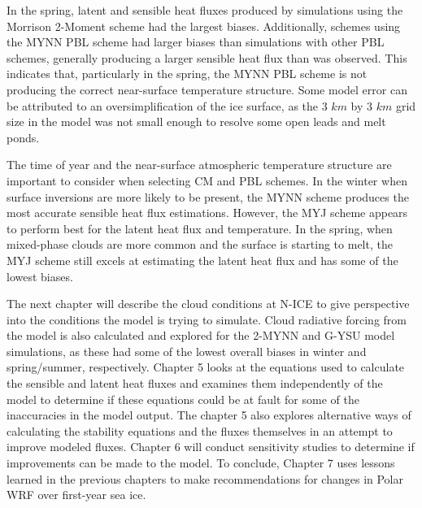 In the spring, latent and sensible heat fluxes produced by simulations using the Morrison 2-Moment scheme had the largest biases. Additionally, schemes using the MYNN PBL scheme had larger biases than simulations with other PBL schemes, generally producing a larger sensible heat flux than was observed. This indicates that, particularly in the spring, the MYNN PBL scheme is not producing the correct near-surface temperature structure. Some model error can be attributed to an oversimplification of the ice surface, as the 3 $km$ by 3 $km$ grid size in the model was not small enough to resolve some open leads and melt ponds. 

The time of year and the near-surface atmospheric temperature structure are important to consider when selecting CM and PBL schemes. In the winter when surface inversions are more likely to be present, the MYNN scheme produces the most accurate sensible heat flux estimations. However, the MYJ scheme appears to perform best for the latent heat flux and temperature. In the spring, when mixed-phase clouds are more common and the surface is starting to melt, the MYJ scheme still excels at estimating the latent heat flux and has some of the lowest biases. 

The next chapter will describe the cloud conditions at N-ICE to give perspective into the conditions the model is trying to simulate. Cloud radiative forcing from the model is also calculated and explored for the 2-MYNN and G-YSU model simulations, as these had some of the lowest overall biases in winter and spring/summer, respectively. Chapter 5 looks at the equations used to calculate the sensible and latent heat fluxes and examines them independently of the model to determine if these equations could be at fault for some of the inaccuracies in the model output. The chapter 5 also explores alternative ways of calculating the stability equations and the fluxes themselves in an attempt to improve modeled fluxes. Chapter 6 will conduct sensitivity studies to determine if improvements can be made to the model. To conclude, Chapter 7 uses lessons learned in the previous chapters to make recommendations for changes in Polar WRF over first-year sea ice. 